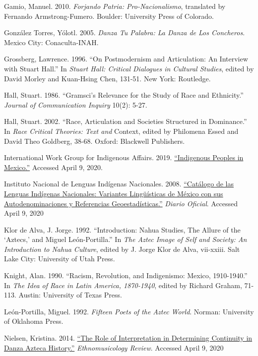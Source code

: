 \documentclass{scrartcl}
\begin{document}
 Gamio, Manuel. 2010. \emph{Forjando Patria:
Pro-Nacionalismo}, translated by Fernando Armstrong-Fumero. Boulder:
University Press of Colorado.

 González Torres, Yólotl. 2005. \emph{Danza Tu Palabra: La
Danza de Los Concheros}. Mexico City: Conaculta-INAH.

 Grossberg, Lawrence. 1996. ``On Postmodernism and
Articulation: An Interview with Stuart Hall.'' In \emph{Stuart Hall:
Critical Dialogues in Cultural Studies}, edited by David Morley and
Kuan-Hsing Chen, 131-51. New York: Routledge.

 Hall, Stuart. 1986. ``Gramsci's Relevance for the Study of
Race and Ethnicity.'' \emph{Journal of Communication Inquiry} 10(2):
5-27.

 Hall, Stuart. 2002. ``Race, Articulation and Societies
Structured in Dominance.'' In \emph{Race Critical Theories: Text and}
Context, edited by Philomena Essed and David Theo Goldberg, 38-68.
Oxford: Blackwell Publishers.

 International Work Group for Indigenous Affairs. 2019.
\href{https://www.iwgia.org/en/mexico.html}{``Indigenous Peoples in
Mexico.''} Accessed April 9, 2020.

 Instituto Nacional de Lenguas Indígenas Nacionales. 2008.
\href{https://www.inali.gob.mx/pdf/CLIN_completo.pdf}{``Catálogo de las
Lenguas Indígenas Nacionales: Variantes Lingüísticas de México con sus
Autodenominaciones y Referencias Geoestadísticas.''} \emph{Diario
Oficial}. Accessed April 9, 2020

 Klor de Alva, J. Jorge. 1992. ``Introduction: Nahua Studies,
The Allure of the `Aztecs,' and Miguel León-Portilla.'' In \emph{The
Aztec Image of Self and Society: An Introduction to Nahua Culture},
edited by J. Jorge Klor de Alva, vii-xxiii. Salt Lake City: University
of Utah Press.

 Knight, Alan. 1990. ``Racism, Revolution, and Indigenismo:
Mexico, 1910-1940.'' In \emph{The Idea of Race in Latin America,
1870-1940}, edited by Richard Graham, 71-113. Austin: University of
Texas Press.

 León-Portilla, Miguel. 1992. \emph{Fifteen Poets of the Aztec
World}. Norman: University of Oklahoma Press.

 Nielsen, Kristina. 2014.
\href{https://ethnomusicologyreview.ucla.edu/content/role-interpretation-determining-continuity-danza-azteca-history}{``The
Role of Interpretation in Determining Continuity in Danza Azteca
History.''} \emph{Ethnomusicology Review}. Accessed April 9, 2020
\end{document}

